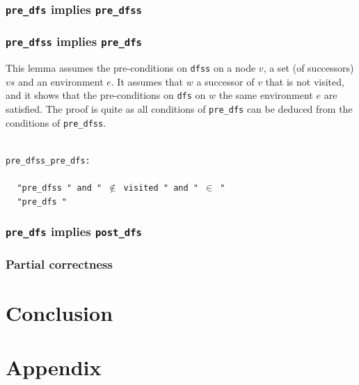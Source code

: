 \documentclass[a4 paper, 12pt]{article}
\newcommand{\lm}{{\color{isa_blue}{lemma}}}
\newcommand{\fixes}{{\color{isa_green}{fixes}}}
\newcommand{\assumes}{{\color{isa_green}{assumes}}}
\newcommand{\shows}{{\color{isa_green}{shows}}}
\newcommand{\isa}[1]{\small\texttt{\\\noindent#1}}
\newcommand{\blue}[1]{{\color{isa_dark_blue}{#1}}}
\theoremstyle{definition}
\begin{document}
{\subsubsection{\texttt{pre\_dfs} implies \texttt{pre\_dfss}}

\subsubsection{\texttt{pre\_dfss} implies \texttt{pre\_dfs}}
This lemma assumes the pre-conditions on \texttt{dfss} on a node $v$, a set (of successors) $vs$ and an environment $e$. It assumes that $w$ a successor of $v$ that is not visited, and it shows that the pre-conditions on \texttt{dfs} on $w$ the same environment $e$ are satisfied. The proof is quite as all conditions of \texttt{pre\_dfs} can be deduced from the conditions of \texttt{pre\_dfss}.

\isa{
\lm{} pre\_dfss\_pre\_dfs:\\
$~~~$\fixes{} \blue{w}\\
$~~~$\assumes{} "pre\_dfss \blue{v vs e}" and "\blue{w} $\notin$ visited \blue{e}" and "\blue{w} $\in$ \blue{vs}"\\
$~~~$\shows{} "pre\_dfs \blue{w e}"
}

\subsubsection{\texttt{pre\_dfs} implies \texttt{post\_dfs}}

\subsubsection{Partial correctness}


\section{Conclusion}


\section{Appendix}\label{appendix}
}
\end{document}
